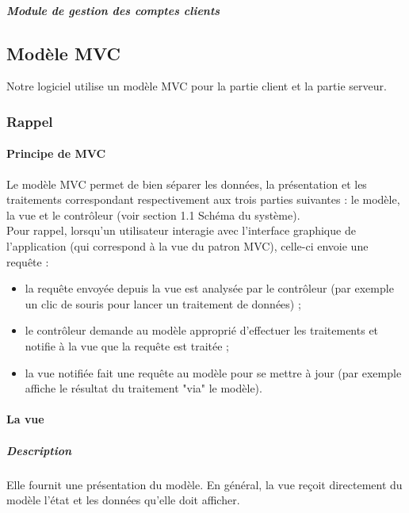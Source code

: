 \documentclass[10pt,a4paper]{report}
\begin{document}
				\subparagraph{Module de gestion des comptes clients}
				\begin{flushleft}
					
				\end{flushleft}
				
				
	\subsection{Modèle MVC}
		Notre logiciel utilise un modèle MVC pour la partie client et la partie serveur.
		\subsubsection{Rappel}
			
			\paragraph{Principe de MVC}
			\begin{flushleft}

			Le modèle MVC permet de bien séparer les données, la présentation et les traitements correspondant respectivement aux trois parties suivantes : le modèle, la vue et le contrôleur (voir section 1.1 Schéma du système).\\
Pour rappel, lorsqu'un utilisateur interagie avec l'interface graphique de l'application (qui correspond à la vue du patron MVC), celle-ci envoie une requête  :
				\begin{itemize}
					\item la requête envoyée depuis la vue est analysée par le contrôleur (par exemple un clic de souris pour lancer un traitement de données) ;
    				\item le contrôleur demande au modèle approprié d'effectuer les traitements et notifie à la vue que la requête est traitée ;
    				\item la vue notifiée fait une requête au modèle pour se mettre à jour (par exemple affiche le résultat du traitement "via" le modèle).

				\end{itemize}
			\end{flushleft}
			
		\paragraph{La vue}
			\subparagraph{Description}
			\begin{flushleft}
				Elle fournit une présentation du modèle. En général, la vue reçoit directement du modèle l’état et les données qu’elle doit afficher.
			\end{flushleft}
			
\end{document}

